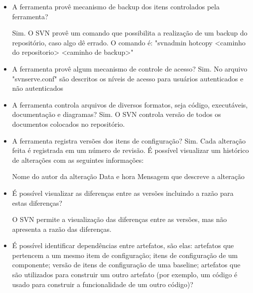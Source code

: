 \begin{itemize}
  \item A ferramenta provê mecanismo de backup dos itens controlados pela ferramenta?

    Sim. O SVN provê um comando que possibilita a realização de um backup do repositório, caso algo dê errado. O comando é:
    "svnadmin hotcopy <caminho do repositorio> <caminho de backup>"

  \item A ferramenta provê algum mecanismo de controle de acesso?
    Sim. No arquivo "svnserve.conf" são descritos os níveis de acesso para usuários autenticados e não autenticados

  \item A ferramenta controla arquivos de diversos formatos, seja código, executáveis, documentação e diagramas?
    Sim. O SVN controla versão de todos os documentos colocados no repositório.

  \item A ferramenta registra versões dos itens de configuração?
    Sim. Cada alteração feita é registrada em um número de revisão. É possível visualizar um histórico de alterações com as seguintes informações:

    \subitem Nome do autor da alteração
    \subitem Data e hora
    \subitem Mensagem que descreve a alteração

  \item É possível visualizar as diferenças entre as versões incluindo a razão para estas 
  diferenças?

      O SVN permite a visualização das diferenças entre as versões, mas não apresenta a razão das diferenças.
  
  \item É possível identificar dependências entre artefatos, são elas: artefatos que pertencem a um mesmo item de configuração; itens de configuração de um componente; versão de itens de configuração de uma baseline; artefatos que são utilizados para construir um outro artefato  (por exemplo, um código é usado para construir a funcionalidade de um outro código)?
  

\end{itemize}
